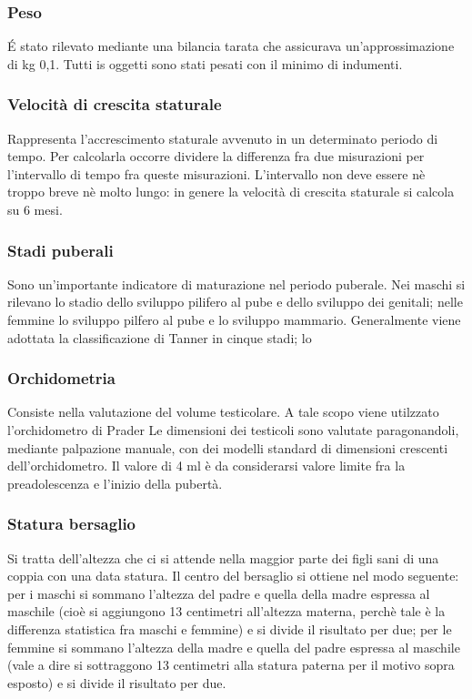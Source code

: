 \subsubsection*{Peso}
 \'E stato rilevato mediante una bilancia tarata che assicurava un'approssimazione di kg 0,1. Tutti is oggetti sono stati pesati con il minimo di indumenti.

\subsubsection*{Velocità di crescita staturale}
Rappresenta l'accrescimento staturale avvenuto in un determinato periodo di tempo. Per calcolarla occorre dividere la differenza fra due misurazioni per l'intervallo di tempo fra queste misurazioni. L'intervallo non deve essere nè troppo breve nè molto lungo: in genere la velocità di crescita staturale si calcola su 6 mesi.

\subsubsection*{Stadi puberali}
Sono un'importante indicatore di maturazione nel periodo puberale. Nei maschi si rilevano lo stadio dello sviluppo pilifero al pube e dello sviluppo dei genitali; nelle femmine lo sviluppo pilfero al pube e lo sviluppo mammario. Generalmente viene adottata la classificazione di Tanner\cite{tanner1990foetus} in cinque stadi; lo 

\subsubsection*{Orchidometria}
Consiste nella valutazione del volume testicolare. A tale scopo viene utilzzato l'orchidometro di Prader
Le dimensioni dei testicoli sono valutate paragonandoli, mediante palpazione manuale, con dei modelli standard di dimensioni crescenti dell'orchidometro. Il valore di 4 ml è da considerarsi valore limite fra la preadolescenza e l'inizio della pubertà.  


\subsubsection*{Statura bersaglio}
Si tratta dell'altezza che ci si attende nella maggior parte dei figli sani di una coppia con una data statura. Il centro del bersaglio si ottiene nel modo seguente: per i maschi si sommano l'altezza del padre e quella della madre espressa al maschile (cioè si aggiungono 13 centimetri all'altezza materna, perchè tale è la differenza statistica fra maschi e femmine) e si divide il risultato per due; per le femmine si sommano l'altezza della madre e quella del padre espressa al maschile (vale a dire si sottraggono 13 centimetri alla statura paterna per il motivo sopra esposto) e si divide il risultato per due. 

